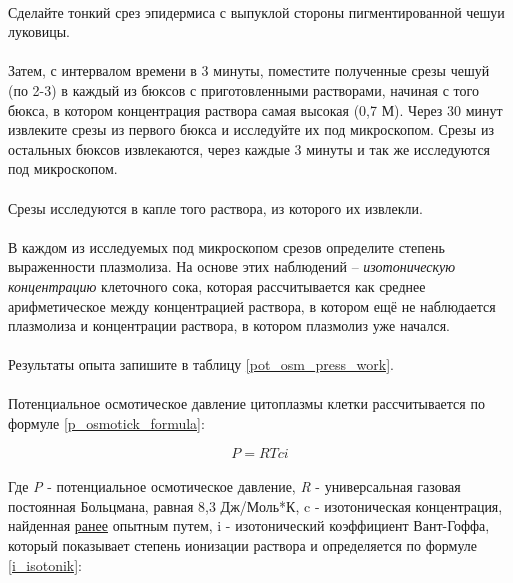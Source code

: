\paragraph*{}Сделайте тонкий срез эпидермиса с выпуклой стороны пигментированной чешуи луковицы.

\paragraph*{}Затем, с интервалом времени в 3 минуты, поместите полученные срезы чешуй (по 2-3) в каждый из бюксов с приготовленными растворами, начиная с того бюкса, в котором концентрация раствора самая высокая (0,7 М). 
Через 30 минут извлеките срезы из первого бюкса и исследуйте их под микроскопом. Срезы из остальных бюксов извлекаются, через каждые 3 минуты и так же исследуются под микроскопом. 

\paragraph*{\warningsign}Срезы исследуются в капле того раствора, из которого их извлекли.

\paragraph*{}В каждом из исследуемых под микроскопом срезов определите степень выраженности плазмолиза. На основе этих наблюдений – \textit{\hypertarget{c_isitonik}{изотоническую концентрацию}} клеточного сока, которая рассчитывается как среднее арифметическое между концентрацией раствора, в котором ещё не наблюдается плазмолиза и концентрации раствора, в котором плазмолиз уже начался.

\paragraph*{}Результаты опыта запишите в таблицу \ref{pot_osm_press_work}.

\paragraph*{}Потенциальное осмотическое давление цитоплазмы клетки рассчитывается по формуле \ref{p_osmotick_formula}:

\begin{equation}
\label{p_osmotick_formula}
	P = RTci
\end{equation}

\paragraph*{}Где \textit{P} - потенциальное осмотическое давление, \textit{R} - универсальная газовая постоянная Больцмана, равная 8,3 Дж/Моль*К, c - изотоническая концентрация, найденная \hyperlink{c_isitonik}{ранее} опытным путем, i - изотонический коэффициент Вант-Гоффа, который показывает степень ионизации раствора и определяется по формуле \ref{i_isotonik}:

